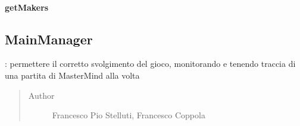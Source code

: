 \documentclass[letterpaper,10pt,italian,openany,oneside]{sphinxmanual}
\begin{document}
\begin{fulllineitems}
\label{\detokenize{test/it/unicam/cs/pa/mastermind/gamecore/GlobalSettings:it.unicam.cs.pa.mastermind.gamecore.GlobalSettings.getBreakers()}}
\end{fulllineitems}



\paragraph{getMakers}
\label{\detokenize{test/it/unicam/cs/pa/mastermind/gamecore/GlobalSettings:getmakers}}

\begin{fulllineitems}
\label{\detokenize{test/it/unicam/cs/pa/mastermind/gamecore/GlobalSettings:it.unicam.cs.pa.mastermind.gamecore.GlobalSettings.getMakers()}}
\end{fulllineitems}



\subsection{MainManager}
\label{\detokenize{test/it/unicam/cs/pa/mastermind/gamecore/MainManager:mainmanager}}\label{\detokenize{test/it/unicam/cs/pa/mastermind/gamecore/MainManager::doc}}

\begin{fulllineitems}
\label{\detokenize{test/it/unicam/cs/pa/mastermind/gamecore/MainManager:it.unicam.cs.pa.mastermind.gamecore.MainManager}}
: permettere il corretto svolgimento del gioco, monitorando e tenendo traccia di una partita di MasterMind alla volta
\begin{quote}\begin{description}
\item[{Author}] \leavevmode
Francesco Pio Stelluti, Francesco Coppola

\end{description}\end{quote}

\end{fulllineitems}
\end{document}
